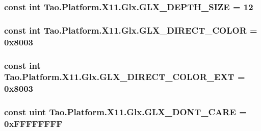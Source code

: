 \label{class_tao_1_1_platform_1_1_x11_1_1_glx_a2edb4c4f6cb3c8aaecba060d252374bb}
\hypertarget{class_tao_1_1_platform_1_1_x11_1_1_glx_a1810eb0afa5700e1e72b6bba71647ce6}{
\subsubsection[{GLX\_\-DEPTH\_\-SIZE}]{\setlength{\rightskip}{0pt plus 5cm}const int {\bf Tao.Platform.X11.Glx.GLX\_\-DEPTH\_\-SIZE} = 12}}
\label{class_tao_1_1_platform_1_1_x11_1_1_glx_a1810eb0afa5700e1e72b6bba71647ce6}
\hypertarget{class_tao_1_1_platform_1_1_x11_1_1_glx_ae7c06440f69e30d7f700e19c41c30a96}{
\subsubsection[{GLX\_\-DIRECT\_\-COLOR}]{\setlength{\rightskip}{0pt plus 5cm}const int {\bf Tao.Platform.X11.Glx.GLX\_\-DIRECT\_\-COLOR} = 0x8003}}
\label{class_tao_1_1_platform_1_1_x11_1_1_glx_ae7c06440f69e30d7f700e19c41c30a96}
\hypertarget{class_tao_1_1_platform_1_1_x11_1_1_glx_ab31b0c872736b40dc162d5f05f171147}{
\subsubsection[{GLX\_\-DIRECT\_\-COLOR\_\-EXT}]{\setlength{\rightskip}{0pt plus 5cm}const int {\bf Tao.Platform.X11.Glx.GLX\_\-DIRECT\_\-COLOR\_\-EXT} = 0x8003}}
\label{class_tao_1_1_platform_1_1_x11_1_1_glx_ab31b0c872736b40dc162d5f05f171147}
\hypertarget{class_tao_1_1_platform_1_1_x11_1_1_glx_a11cda7d73face7eabc20e12fb7d990a1}{
\subsubsection[{GLX\_\-DONT\_\-CARE}]{\setlength{\rightskip}{0pt plus 5cm}const uint {\bf Tao.Platform.X11.Glx.GLX\_\-DONT\_\-CARE} = 0xFFFFFFFF}}
